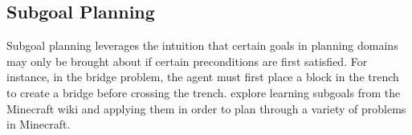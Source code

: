 \documentclass[]{article}
\begin{document}





\subsection{Subgoal Planning}
\label{sec:subgoals}

Subgoal planning leverages the intuition that certain goals in
planning domains may only be brought about if certain preconditions
are first satisfied. For instance, in the bridge problem, the agent must
first place a block in the trench to create a bridge before crossing
the trench.  \citet{branavan12a} explore learning subgoals from the
Minecraft wiki and applying them in order to plan through a variety of
problems in Minecraft.
\end{document}

